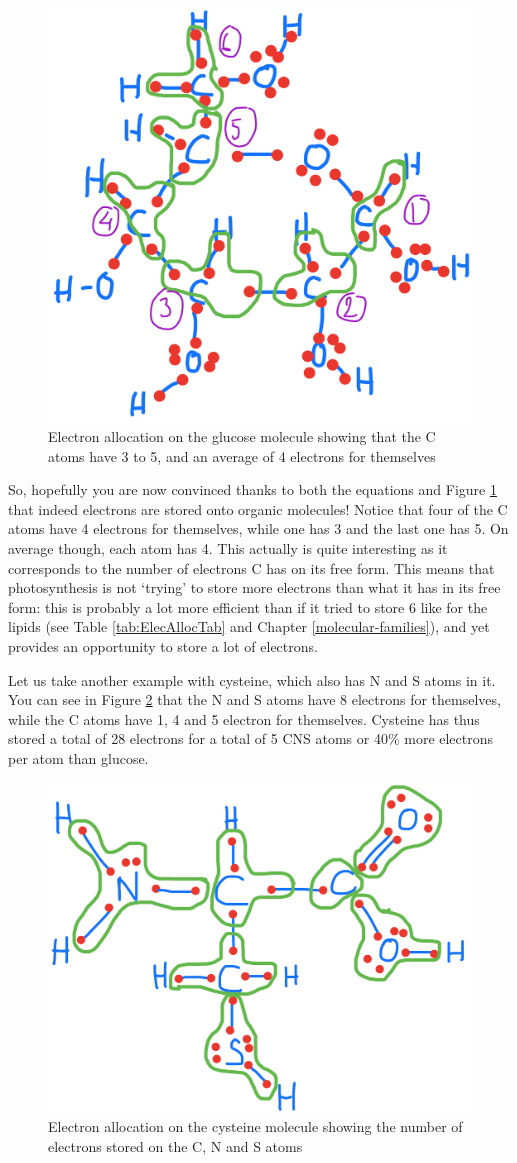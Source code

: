 \documentclass[]{book}
\theoremstyle{definition}
\theoremstyle{definition}
\theoremstyle{definition}
\theoremstyle{remark}
\begin{document}
\begin{figure}

{\centering \includegraphics[width=0.4\linewidth]{pictures/ElecAlloc_glucose} 

}

\caption{Electron allocation on the glucose molecule showing that the C atoms have 3 to 5, and an average of 4 electrons for themselves}\label{fig:ElecAlloc-glucose}
\end{figure}

So, hopefully you are now convinced thanks to both the equations and
Figure \ref{fig:ElecAlloc-glucose} that indeed electrons are stored onto
organic molecules! Notice that four of the C atoms have 4 electrons for
themselves, while one has 3 and the last one has 5. On average though,
each atom has 4. This actually is quite interesting as it corresponds to
the number of electrons C has on its free form. This means that
photosynthesis is not `trying' to store more electrons than what it has
in its free form: this is probably a lot more efficient than if it tried
to store 6 like for the lipids (see Table \ref{tab:ElecAllocTab} and
Chapter \ref{molecular-families}), and yet provides an opportunity to
store a lot of electrons.

Let us take another example with cysteine, which also has N and S atoms
in it. You can see in Figure \ref{fig:ElecAlloc-cysteine} that the N and
S atoms have 8 electrons for themselves, while the C atoms have 1, 4 and
5 electron for themselves. Cysteine has thus stored a total of 28
electrons for a total of 5 CNS atoms or 40\% more electrons per atom
than glucose.

\begin{figure}

{\centering \includegraphics[width=0.4\linewidth]{pictures/ElecAlloc_cysteine} 

}

\caption{Electron allocation on the cysteine molecule showing the number of electrons stored on the C, N and S atoms }\label{fig:ElecAlloc-cysteine}
\end{figure}
\end{document}
